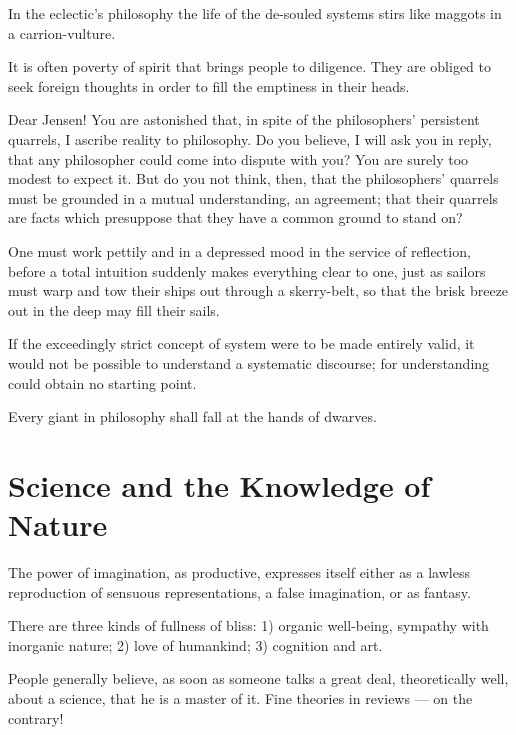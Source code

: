 \documentclass[12pt,a4paper]{article}
\newcommand{\opage}[1]{\marginnote{\footnotesize\textit{[#1]}}}
\newcommand{\aphsep}{\par\smallskip\centerline{\textasteriskcentered}\smallskip}
\begin{document}
\aphsep

In the eclectic's philosophy the life of the de-souled systems stirs like maggots
in a carrion-vulture.

\opage{24}It is often poverty of spirit that brings people to diligence. They are
obliged to seek foreign thoughts in order to fill the emptiness in their heads.

\aphsep

Dear Jensen! You are astonished that, in spite of the philosophers' persistent
quarrels, I ascribe reality to philosophy. Do you believe, I will ask you in
reply, that any philosopher could come into dispute with you? You are surely too
modest to expect it. But do you not think, then, that the philosophers' quarrels
must be grounded in a mutual understanding, an agreement; that their quarrels are
facts which presuppose that they have a common ground to stand on?

\aphsep

One must work pettily and in a depressed mood in the service of reflection,
before a total intuition suddenly makes everything clear to one, just as sailors
must warp and tow their ships out through a skerry-belt, so that the brisk breeze
out in the deep may fill their sails.

\aphsep

If the exceedingly strict concept of system were to be made entirely valid, it
would not be possible to understand a systematic discourse; for understanding
could obtain no starting point.

\aphsep

Every giant in philosophy shall fall at the hands of dwarves.

\bigskip

\section*{Science and the Knowledge of Nature}
\label{ch:003}

The power of imagination, as productive, expresses itself either as a lawless
reproduction of sensuous representations, a false imagination, or as fantasy.

\aphsep

There are three kinds of fullness of bliss: 1) organic well-being, sympathy with
inorganic nature; 2) love of humankind; 3) cognition and art.

\aphsep

People generally believe, as soon as someone talks a great deal, theoretically
well, about a science, that he is a master of it. Fine theories in reviews ---
on the contrary!
\end{document}
